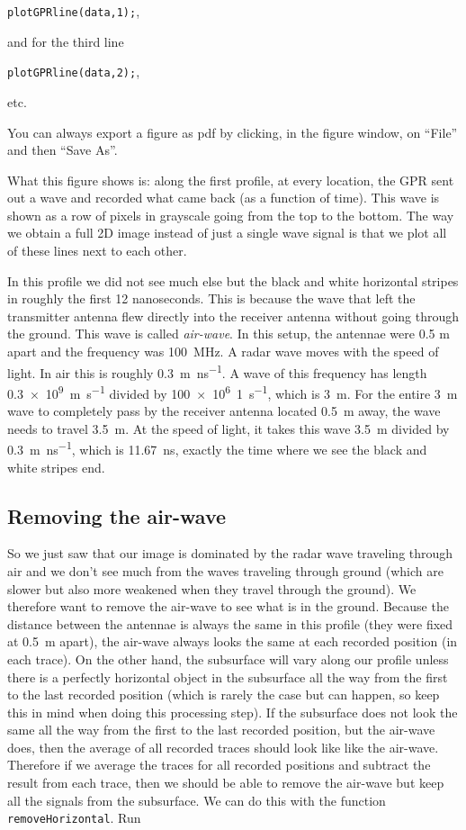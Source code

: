 \documentclass[11pt]{article}
\begin{document}
\qquad \verb#plotGPRline(data,1);#,

and for the third line

\qquad \verb#plotGPRline(data,2);#,

etc.
 
You can always export a figure as pdf by clicking, in the figure
window, on ``File'' and then ``Save As''.

What this figure shows is: along the first profile, at every location,
the GPR sent out a wave and recorded what came back (as a function of
time). This wave is shown as a row of pixels in grayscale going from
the top to the bottom. The way we obtain a full 2D image instead of
just a single wave signal is that we plot all of these lines next to
each other.

In this profile we did not see much else but the black and white
horizontal stripes in roughly the first 12 nanoseconds. This is
because the wave that left the transmitter antenna flew directly into
the receiver antenna without going through the ground. This wave is
called \emph{air-wave}. In this setup, the antennae were 0.5 m apart
and the frequency was \SI{100}{MHz}. A radar wave moves with the speed
of light. In air this is roughly \SI{0.3}{m\per\nano\second}. A wave
of this frequency has length \SI{0.3e9}{m\per\second} divided by
\SI{100e6}{1\per\second}, which is \SI{3}{m}. For the entire \SI{3}{m}
wave to completely pass by the receiver antenna located \SI{0.5}{m}
away, the wave needs to travel \SI{3.5}{m}. At the speed of light, it
takes this wave \SI{3.5}{m} divided by \SI{0.3}{m\per\nano\second},
which is \SI{11.67}{\nano\second}, exactly the time where we see the
black and white stripes end.

\subsection{Removing the air-wave}

So we just saw that our image is dominated by the radar wave traveling
through air and we don't see much from the waves traveling through
ground (which are slower but also more weakened when they travel
through the ground). We therefore want to remove the air-wave to see
what is in the ground. Because the distance between the antennae is
always the same in this profile (they were fixed at \SI{0.5}{m}
apart), the air-wave always looks the same at each recorded position
(in each trace). On the other hand, the subsurface will vary along our
profile unless there is a perfectly horizontal object in the
subsurface all the way from the first to the last recorded position
(which is rarely the case but can happen, so keep this in mind when
doing this processing step). If the subsurface does not look the same
all the way from the first to the last recorded position, but the
air-wave does, then the average of all recorded traces should look
like like the air-wave. Therefore if we average the traces for all
recorded positions and subtract the result from each trace, then we
should be able to remove the air-wave but keep all the signals from
the subsurface. We can do this with the function
\verb#removeHorizontal#. Run
\end{document}
